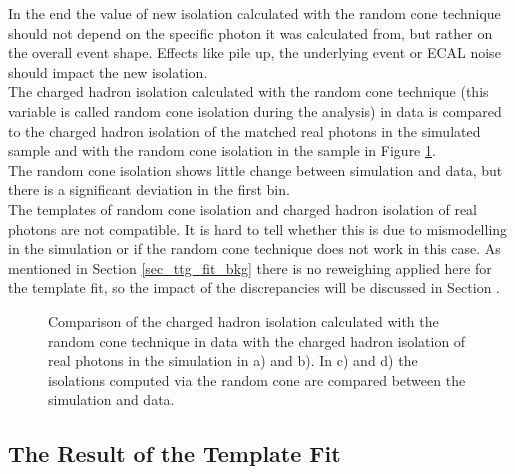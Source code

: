 In the end the value of new isolation calculated with the random cone technique should not depend on the specific photon it was calculated from, but rather on the overall event shape. Effects like pile up, the underlying event or ECAL noise should impact the new isolation.\\
The charged hadron isolation calculated with the random cone technique (this variable is called random cone isolation during the analysis) in data is compared to the charged hadron isolation of the matched real photons in the simulated \ttgamma sample and with the random cone isolation in the \ttgamma sample in Figure \ref{fig_ttg_fit_raco}.\\
The random cone isolation shows little change between simulation and data, but there is a significant deviation in the first bin. \\
The templates of random cone isolation and charged hadron isolation of real photons are not compatible. It is hard to tell whether this is due to mismodelling in the simulation or if the random cone technique does not work in this case. As mentioned in Section \ref{sec_ttg_fit_bkg} there is no reweighing applied here for the template fit, so the impact of the discrepancies will be discussed in Section .


\begin{figure}[ht]
  \caption{Comparison of the charged hadron isolation calculated with the random cone technique in data with the charged hadron isolation of real photons in the \ttgamma simulation in a) and b). In c) and d) the isolations computed via the random cone are compared between the \ttgamma simulation and data.}
  \label{fig_ttg_fit_raco}
\end{figure}

\subsection{The Result of the Template Fit}
\label{sec_ttg_fit_res}

